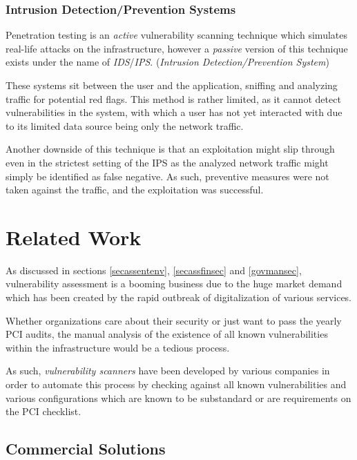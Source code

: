 \documentclass[a4paper,12pt]{article}
\begin{document}
\subsubsection{Intrusion Detection/Prevention Systems}
 
	
	Penetration testing is an \textit{active} vulnerability scanning technique which simulates real-life attacks on the infrastructure, however a \textit{passive} version of this technique exists under the name of \textit{IDS}/\textit{IPS}. (\textit{Intrusion Detection/Prevention System})
	
	These systems sit between the user and the application, sniffing and analyzing traffic for potential red flags. This method is rather limited, as it cannot detect vulnerabilities in the system, with which a user has not yet interacted with due to its limited data source being only the network traffic.
	
	Another downside of this technique is that an exploitation might slip through even in the strictest setting of the IPS as the analyzed network traffic might simply be identified as false negative. As such, preventive measures were not taken against the traffic, and the exploitation was successful.
		
\section{Related Work} \label{relwork}
 
	
	As discussed in sections \ref{secassentenv}, \ref{secassfinsec} and \ref{govmansec}, vulnerability assessment is a booming business due to the huge market demand which has been created by the rapid outbreak of digitalization of various services.
	
	Whether organizations care about their security or just want to pass the yearly PCI audits, the manual analysis of the existence of all known vulnerabilities within the infrastructure would be a tedious process.
	
	As such, \textit{vulnerability scanners} have been developed by various companies in order to automate this process by checking against all known vulnerabilities and various configurations which are known to be substandard or are requirements on the PCI checklist.
	
\subsection{Commercial Solutions} \label{comtools}
 
	
\end{document}

